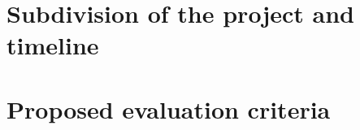 \documentclass[12pt, a4paper]{article}
\begin{document}
\section{Subdivision of the project and timeline}\label{sec:subdivision-of-the-project-and-timeline}

\section{Proposed evaluation criteria}\label{sec:proposed-evaluation-criteria}



\end{document}

